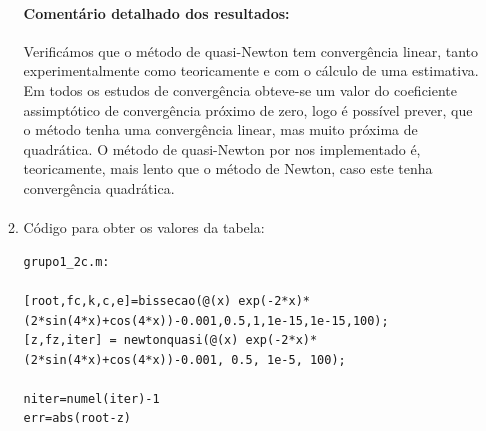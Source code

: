 \documentclass[a4paper,10pt]{extarticle}
\begin{document}
\begin{enumerate}
\begin{enumerate}
\paragraph{Comentário detalhado dos resultados:}

Verificámos que o método de quasi-Newton tem convergência linear, tanto experimentalmente como teoricamente e com o cálculo de uma estimativa. Em todos os estudos de convergência obteve-se um valor do coeficiente assimptótico de convergência próximo de zero, logo é possível prever, que o método tenha uma convergência linear, mas muito próxima de quadrática.
O método de quasi-Newton por nos implementado é, teoricamente, mais lento que o método de Newton, caso este tenha convergência quadrática.

\paragraph{}
\item Código para obter os valores da tabela:
{\small
\begin{verbatim}
grupo1_2c.m:

[root,fc,k,c,e]=bissecao(@(x) exp(-2*x)*(2*sin(4*x)+cos(4*x))-0.001,0.5,1,1e-15,1e-15,100);
[z,fz,iter] = newtonquasi(@(x) exp(-2*x)*(2*sin(4*x)+cos(4*x))-0.001, 0.5, 1e-5, 100);

niter=numel(iter)-1
err=abs(root-z)

\end{verbatim}

}
\end{enumerate}
\end{enumerate}
\end{document}
